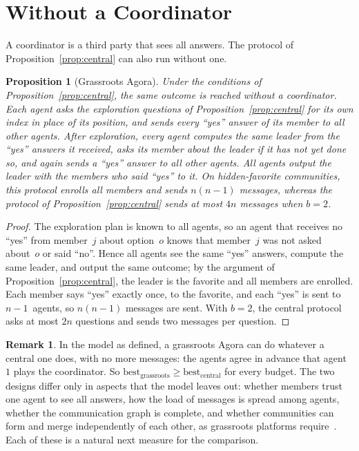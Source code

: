 \documentclass[11pt]{article}
\newtheorem{proposition}{Proposition}
\theoremstyle{definition}
\newtheorem{remark}{Remark}
\newcommand{\best}{\mathrm{best}}
\begin{document}
\section{Without a Coordinator}

A coordinator is a third party that sees all answers.
The protocol of Proposition~\ref{prop:central} can also run without one.

\begin{proposition}[Grassroots Agora]\label{prop:grassroots}
Under the conditions of Proposition~\ref{prop:central}, the same outcome is reached without a coordinator.
Each agent asks the exploration questions of Proposition~\ref{prop:central} for its own index in place of its position, and sends every ``yes'' answer of its member to all other agents.
After exploration, every agent computes the same leader from the ``yes'' answers it received, asks its member about the leader if it has not yet done so, and again sends a ``yes'' answer to all other agents.
All agents output the leader with the members who said ``yes'' to it.
On hidden-favorite communities, this protocol enrolls all members and sends $n(n-1)$ messages, whereas the protocol of Proposition~\ref{prop:central} sends at most $4n$ messages when $b = 2$.
\end{proposition}

\begin{proof}
The exploration plan is known to all agents, so an agent that receives no ``yes'' from member~$j$ about option~$o$ knows that member~$j$ was not asked about~$o$ or said ``no''.
Hence all agents see the same ``yes'' answers, compute the same leader, and output the same outcome; by the argument of Proposition~\ref{prop:central}, the leader is the favorite and all members are enrolled.
Each member says ``yes'' exactly once, to the favorite, and each ``yes'' is sent to $n-1$~agents, so $n(n-1)$ messages are sent.
With $b = 2$, the central protocol asks at most $2n$ questions and sends two messages per question.
\end{proof}

\begin{remark}\label{rem:simulate}
In the model as defined, a grassroots Agora can do whatever a central one does, with no more messages: the agents agree in advance that agent~$1$ plays the coordinator.
So $\best_{\text{grassroots}} \ge \best_{\text{central}}$ for every budget.
The two designs differ only in aspects that the model leaves out: whether members trust one agent to see all answers, how the load of messages is spread among agents, whether the communication graph is complete, and whether communities can form and merge independently of each other, as grassroots platforms require~\cite{shapiro2026grassroots}.
Each of these is a natural next measure for the comparison.
\end{remark}
\end{document}
